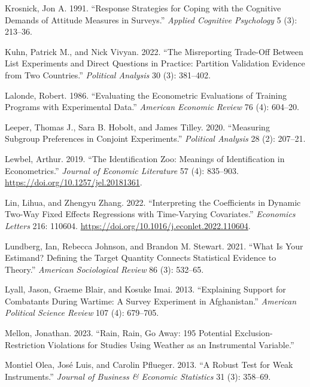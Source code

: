 \documentclass[
]{article}
\newlength{\cslhangindent}
\newenvironment{CSLReferences}[2] %
 {\begin{list}{}{%
  \setlength{\itemindent}{0pt}
  \setlength{\leftmargin}{0pt}
  \setlength{\parsep}{0pt}
  \ifodd #1
   \setlength{\leftmargin}{\cslhangindent}
   \setlength{\itemindent}{-1\cslhangindent}
  \fi
  \setlength{\itemsep}{#2\baselineskip}}}
 {\end{list}}
\begin{document}
\begin{CSLReferences}{1}{0}
Krosnick, Jon A. 1991. {``Response Strategies for Coping with the Cognitive Demands of Attitude Measures in Surveys.''} \emph{Applied Cognitive Psychology} 5 (3): 213--36.

Kuhn, Patrick M., and Nick Vivyan. 2022. {``The Misreporting Trade-Off Between List Experiments and Direct Questions in Practice: Partition Validation Evidence from Two Countries.''} \emph{Political Analysis} 30 (3): 381--402.

Lalonde, Robert. 1986. {``Evaluating the Econometric Evaluations of Training Programs with Experimental Data.''} \emph{American Economic Review} 76 (4): 604--20.

Leeper, Thomas J., Sara B. Hobolt, and James Tilley. 2020. {``Measuring Subgroup Preferences in Conjoint Experiments.''} \emph{Political Analysis} 28 (2): 207--21.

Lewbel, Arthur. 2019. {``The Identification Zoo: Meanings of Identification in Econometrics.''} \emph{Journal of Economic Literature} 57 (4): 835--903. \url{https://doi.org/10.1257/jel.20181361}.

Lin, Lihua, and Zhengyu Zhang. 2022. {``Interpreting the Coefficients in Dynamic Two-Way Fixed Effects Regressions with Time-Varying Covariates.''} \emph{Economics Letters} 216: 110604. \url{https://doi.org/10.1016/j.econlet.2022.110604}.

Lundberg, Ian, Rebecca Johnson, and Brandon M. Stewart. 2021. {``What Is Your Estimand? Defining the Target Quantity Connects Statistical Evidence to Theory.''} \emph{American Sociological Review} 86 (3): 532--65.

Lyall, Jason, Graeme Blair, and Kosuke Imai. 2013. {``Explaining Support for Combatants During Wartime: A Survey Experiment in {Afghanistan}.''} \emph{American Political Science Review} 107 (4): 679--705.

Mellon, Jonathan. 2023. {``Rain, Rain, Go Away: 195 Potential Exclusion-Restriction Violations for Studies Using Weather as an Instrumental Variable.''}

Montiel Olea, José Luis, and Carolin Pflueger. 2013. {``A Robust Test for Weak Instruments.''} \emph{Journal of Business \& Economic Statistics} 31 (3): 358--69.


\end{CSLReferences}
\end{document}
